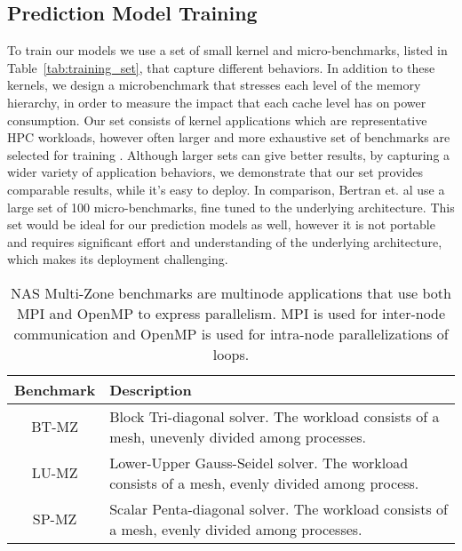 \subsection{Prediction Model Training}
To train our models we use a set of small kernel and micro-benchmarks, listed in
Table~\ref{tab:training_set}, that capture different behaviors.  In addition to these
kernels, we design a microbenchmark that stresses each level of the memory hierarchy, in
order to measure the impact that each cache level has on power consumption.  Our set
consists of kernel applications which are representative HPC workloads, however often
larger and more exhaustive set of benchmarks are selected for training
\cite{Bertran:2012:SEC:2457472.2457499}.  Although larger sets can give better results, by
capturing a wider variety of application behaviors, we demonstrate that our set provides
comparable results, while it's easy to deploy.  In comparison, Bertran et. al
\cite{Bertran:2012:SEC:2457472.2457499} use a large set of 100 micro-benchmarks, fine
tuned to the underlying architecture.  This set would be ideal for our prediction models
as well, however it is not portable and requires significant effort and understanding of
the underlying architecture, which makes its deployment challenging.

\begin{table}
        \centering
        \caption{NAS Multi-Zone benchmarks are multinode applications that use both MPI and OpenMP
		to express parallelism.  MPI is used for inter-node communication and OpenMP is used 
		for intra-node parallelizations of loops.}
        \label{tab:nas_mz_set}
				\def\arraystretch{1.5}%
				\begin{tabular}{ | c | m{12cm} | }
                \hline
                \textbf{Benchmark} & \textbf{Description} \\
                \hline
                \hline
                BT-MZ & Block Tri-diagonal solver. The workload consists of a mesh, unevenly divided among processes. \\
                \hline
                LU-MZ & Lower-Upper Gauss-Seidel solver. The workload consists of a mesh, evenly divided among process. \\
                \hline
                SP-MZ & Scalar Penta-diagonal solver. The workload consists of a mesh, evenly divided among processes. \\
                \hline
        \end{tabular}
\end{table}



